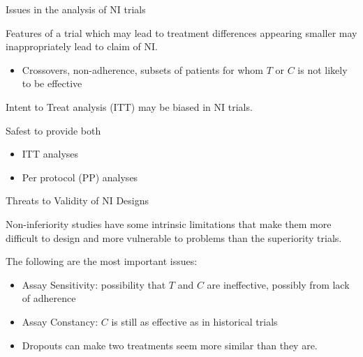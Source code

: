 \documentclass[ignorenonframetext,]{beamer}
\providecommand{\tightlist}{%
\setlength{\itemsep}{0pt}\setlength{\parskip}{0pt}}
\begin{document}
\begin{frame}{Issues in the analysis of NI trials}

Features of a trial which may lead to treatment differences appearing
smaller may inappropriately lead to claim of NI.

\begin{itemize}
\tightlist
\item
  Crossovers, non-adherence, subsets of patients for whom \(T\) or \(C\)
  is not likely to be effective
\end{itemize}

Intent to Treat analysis (ITT) may be biased in NI trials.

Safest to provide both

\begin{itemize}
\item
  ITT analyses
\item
  Per protocol (PP) analyses
\end{itemize}

\end{frame}

\begin{frame}{Threats to Validity of NI Designs}

Non-inferiority studies have some intrinsic limitations that make them
more difficult to design and more vulnerable to problems than the
superiority trials. \medskip

The following are the most important issues:

\begin{itemize}
\item
  Assay Sensitivity: possibility that \(T\) and \(C\) are ineffective,
  possibly from lack of adherence
\item
  Assay Constancy: \(C\) is still as effective as in historical trials
\item
  Dropouts can make two treatments seem more similar than they are.
\end{itemize}

\end{frame}
\end{document}
